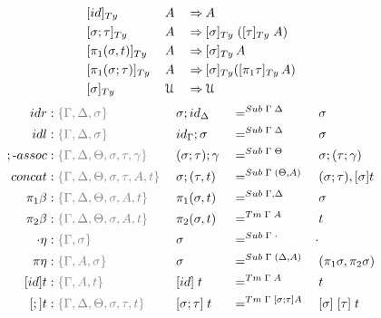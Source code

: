 \documentclass[a4paper,UKenglish,numberwithinsect,cleveref,thm-restate]{lipics-v2021}
\begin{document}
\begin{alignat*}{5}
  & [ \idS ]_{\Ty}\,               && A           && \reduce A \\
  & [ \sigma ; \tau ]_{\Ty}\,      && A           && \reduce [ \sigma ]_{\Ty}\;([ \tau ]_{\Ty}\;A) \\
  & [ \pi_1(\sigma, t) ]_{\Ty}\,   && A           && \reduce [\sigma]_\Ty\,A \\
  & [ \pi_1(\sigma; \tau) ]_{\Ty}\,&& A           && \reduce [\sigma]_\Ty ([\pi_1\tau]_\Ty \,A) \\
  & [ \sigma ]_{\Ty}\,             && \UU         && \reduce \UU
\end{alignat*}
\begin{alignat*}{5}
  \mathsf{idr}    & : \implicit{\Gamma, \Delta, \sigma}\; && {\sigma ; \idS_{\Delta}} && =^{\Sub\;\Gamma\;\Delta} && {\sigma} \\
  \mathsf{idl}    & : \implicit{\Gamma, \Delta, \sigma}\; && {\idS_{\Gamma} ; \sigma} && =^{\Sub\;\Gamma\;\Delta} && {\sigma} \\
  ;\text{-}\mathsf{assoc} & : \implicit{\Gamma, \Delta, \Theta, \sigma, \tau, \gamma}\; && (\sigma ; \tau) ; \gamma && =^{\Sub\;\Gamma\;\Theta} &&  \sigma ; (\tau ; \gamma) \\
  \mathsf{concat} & : \implicit{\Gamma, \Delta, \Theta, \sigma, \tau, A, t}\; &&\sigma ; (\tau , t) && =^{\Sub\;\Gamma\;(\Theta, A)} &&  (\sigma ; \tau) , [ \sigma ] t \\
  \pi_1\beta      & : \implicit{\Gamma, \Delta, \Theta, \sigma, A, t}\; && \pi_1(\sigma , t)        && =^{\Sub\;\Gamma,\Delta} &&  \sigma \\
  \pi_2\beta      & : \implicit{\Gamma, \Delta, \Theta, \sigma, A, t}\; && \pi_2(\sigma , t)        && =^{\Tm\;\Gamma\; A} &&  t \\
  \emptyctx\eta   & : \implicit{\Gamma, \sigma}\; && \sigma                   && =^{\Sub\;\Gamma\;\emptyctx} & \emptysub \\
  \pi\eta         & : \implicit{\Gamma, A, \sigma}\; && \sigma                   && =^{\Sub\;\Gamma\;(\Delta, A)} &&  (\pi_1 \sigma, \pi_2 \sigma) \\
  [\idS]t         & : \implicit{\Gamma, A, t}\; && {[\idS]\;t}          && =^{\Tm\;\Gamma\;A} && t \\
  [;]t            & :\implicit{\Gamma, \Delta, \Theta, \sigma, \tau, t}\; && {[\sigma ; \tau]\;t} && =^{\Tm\;\Gamma\;[\sigma ; \tau] A} && {[ \sigma ]\;[ \tau ]\;t}
\end{alignat*}
\end{document}
